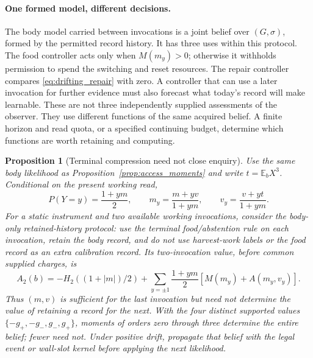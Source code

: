 \documentclass[12pt]{article}
\newtheorem{proposition}[theorem]{Proposition}
\theoremstyle{definition}
\newcommand{\E}{\mathbb E}
\begin{document}
\paragraph{One formed model, different decisions.}

The body model carried between invocations is a joint belief over
$(G,\sigma)$, formed by the permitted record history. It has three
uses within this protocol. The food controller acts only when
$M(m_y)>0$; otherwise it withholds permission to spend the switching
and reset resources. The repair controller compares
\eqref{eq:drifting_repair} with zero. A controller that can use a
later invocation for further evidence must also forecast what
today's record will make learnable. These are not three independently
supplied assessments of the observer. They use different functions
of the same acquired belief. A finite horizon and read quota, or a
specified continuing budget, determine which functions are worth
retaining and computing.

\begin{proposition}[Terminal compression need not close enquiry]
\label{prop:enquiry_moments}
Use the same body likelihood as Proposition~\ref{prop:access_moments}
and write $t=\E_bX^3$. Conditional on the present working read,
\begin{equation}\label{eq:enquiry_moments}
 P(Y=y)=\frac{1+ym}{2},\qquad
 m_y=\frac{m+yv}{1+ym},\qquad
 v_y=\frac{v+yt}{1+ym}.
\end{equation}
For a static instrument and two available working invocations,
consider the body-only retained-history protocol: use the terminal
food/abstention rule on each invocation, retain the body record,
and do not use harvest-work labels or the food record as an extra
calibration record. Its two-invocation value, before common
supplied charges, is
\begin{equation}\label{eq:two_call_value}
 A_2(b)=-H_2((1+|m|)/2)
       +\sum_{y=\pm1}\frac{1+ym}{2}
                  [M(m_y)+A(m_y,v_y)].
\end{equation}
Thus $(m,v)$ is sufficient for the last invocation but need not
determine the value of retaining a record for the next. With the
four distinct supported values $\{-g_+,-g_-,g_-,g_+\}$, moments of
orders zero through three determine the entire belief; fewer
need not. Under positive drift, propagate that belief with the
legal event or wall-slot kernel before applying the next likelihood.
\end{proposition}
\end{document}
